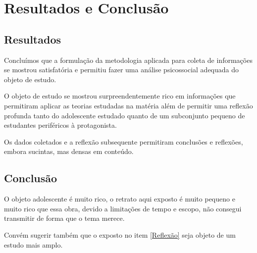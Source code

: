 \chapter{Resultados e Conclusão}

\section{Resultados}

Concluímos que a formulação da metodologia aplicada para coleta de informações se mostrou satisfatória e permitiu fazer uma análise psicossocial adequada do objeto de estudo.

O objeto de estudo se mostrou surpreendentemente rico em informações que permitiram aplicar as teorias estudadas na matéria além de permitir uma reflexão profunda tanto do adolescente estudado quanto de um subconjunto pequeno de estudantes periféricos à protagonista.

Os dados coletados e a reflexão subsequente permitiram conclusões e reflexões, embora sucintas, mas densas em conteúdo.

\section{Conclusão}

O objeto adolescente é muito rico, o retrato aqui exposto é muito pequeno e muito rico que essa obra, devido a limitações de tempo e escopo, não consegui transmitir de forma que o tema merece.

Convém sugerir também que o exposto no item \ref{Reflexão} seja objeto de um estudo mais amplo.